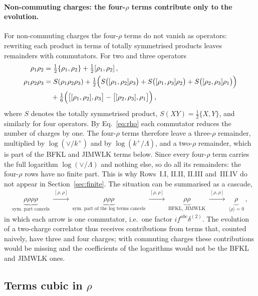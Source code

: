 \paragraph{Non-commuting charges: the four-$\rho$ terms contribute only to the evolution.} For non-commuting charges the four-$\rho$ terms do not vanish as operators: rewriting each product in terms of totally symmetrised products leaves remainders with commutators. For two and three operators
\begin{align}\label{eq:symmetrise}
\rho_1\rho_2&=\tfrac12\{\rho_1,\rho_2\}+\tfrac12[\rho_1,\rho_2]\,,\notag\\
\rho_1\rho_2\rho_3&=S(\rho_1\rho_2\rho_3)+\tfrac12\Big(S\big([\rho_1,\rho_2]\rho_3\big)+S\big([\rho_1,\rho_3]\rho_2\big)+S\big([\rho_2,\rho_3]\rho_1\big)\Big)\notag\\&\quad+\tfrac16\Big(\big[[\rho_1,\rho_2],\rho_3\big]-\big[[\rho_2,\rho_3],\rho_1\big]\Big)\,,
\end{align}
where $S$ denotes the totally symmetrised product, $S(XY)=\frac12\{X,Y\}$, and similarly for four operators. By Eq.~\eqref{eq:rho} each commutator reduces the number of charges by one. The four-$\rho$ terms therefore leave a three-$\rho$ remainder, multiplied by $\log(\vee/k^+)$ and by $\log(k^+/\Lambda)$, and a two-$\rho$ remainder, which is part of the BFKL and JIMWLK terms below. Since every four-$\rho$ term carries the full logarithm $\log(\vee/\Lambda)$ and nothing else, so do all its remainders: the four-$\rho$ rows have no finite part. This is why Rows~I.I, II.II, II.III and~III.IV do not appear in Section~\ref{sec:finite}. The situation can be summarised as a cascade,
\begin{align}\label{eq:cascade}
\underbrace{\rho\rho\rho\rho}_{\text{sym.\ part cancels}}\ \xrightarrow{\ [\rho,\rho]\ }\ \underbrace{\rho\rho\rho}_{\text{sym.\ part of the log terms cancels}}\ \xrightarrow{\ [\rho,\rho]\ }\ \underbrace{\rho\rho}_{\text{BFKL, JIMWLK}}\ \xrightarrow{\ [\rho,\rho]\ }\ \underbrace{\rho}_{\langle\rho\rangle=0}\,,
\end{align}
in which each arrow is one commutator, i.e.\ one factor $if^{abc}\delta^{(2)}$. The evolution of a two-charge correlator thus receives contributions from terms that, counted naively, have three and four charges; with commuting charges these contributions would be missing and the coefficients of the logarithms would not be the BFKL and JIMWLK ones.

\subsection{Terms cubic in \texorpdfstring{$\rho$}{rho}}\label{sec:threerho}

